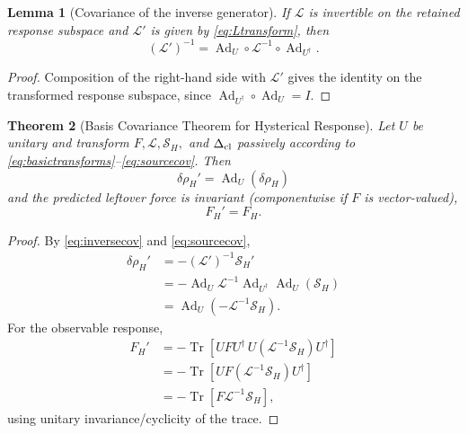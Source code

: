 \documentclass[11pt]{article}
\newtheorem{theorem}{Theorem}[section]
\newtheorem{lemma}[theorem]{Lemma}
\theoremstyle{definition}
\theoremstyle{remark}
\newcommand{\Tr}{\operatorname{Tr}}
\newcommand{\Ad}{\operatorname{Ad}}
\begin{document}
\begin{lemma}[Covariance of the inverse generator]
If $\mathcal L$ is invertible on the retained response subspace and $\mathcal L'$ is given by \eqref{eq:Ltransform}, then
\begin{equation}
 (\mathcal L')^{-1}
 =\Ad_U\circ\mathcal L^{-1}\circ\Ad_{U^\dagger}.
 \label{eq:inversecov}
\end{equation}
\end{lemma}

\begin{proof}
Composition of the right-hand side with $\mathcal L'$ gives the identity on the transformed response subspace, since $\Ad_{U^\dagger}\circ\Ad_U=I$.
\end{proof}

\begin{theorem}[Basis Covariance Theorem for Hysterical Response]\label{thm:basis-covariance}
Let $U$ be unitary and transform $F,\mathcal L,\mathcal S_H,$ and $\Delta_{\rm cl}$ passively according to \eqref{eq:basictransforms}--\eqref{eq:sourcecov}. Then
\begin{equation}
 \boxed{\delta\rho_H'=\Ad_U(\delta\rho_H)}
 \label{eq:rhocov}
\end{equation}
and the predicted leftover force is invariant (componentwise if $F$ is vector-valued),
\begin{equation}
 \boxed{F_H'=F_H.}
 \label{eq:FHinvariant}
\end{equation}
\end{theorem}

\begin{proof}
By \eqref{eq:inversecov} and \eqref{eq:sourcecov},
\begin{align}
 \delta\rho_H'
 &=-(\mathcal L')^{-1}\mathcal S_H'\\
 &=-\Ad_U\mathcal L^{-1}\Ad_{U^\dagger}\Ad_U(\mathcal S_H)\\
 &=\Ad_U(-\mathcal L^{-1}\mathcal S_H).
\end{align}
For the observable response,
\begin{align}
 F_H'
 &=-\Tr\!\left[UFU^\dagger\,U(\mathcal L^{-1}\mathcal S_H)U^\dagger\right]\\
 &=-\Tr\!\left[U F(\mathcal L^{-1}\mathcal S_H)U^\dagger\right]\\
 &=-\Tr\!\left[F\mathcal L^{-1}\mathcal S_H\right],
\end{align}
using unitary invariance/cyclicity of the trace.
\end{proof}
\end{document}
